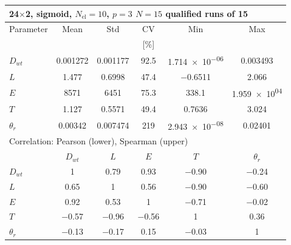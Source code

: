 \begin{tabular}{lccccc}
\toprule
\multicolumn{6}{l}{24$\times$2, sigmoid, $N_{\mathrm{el}}=10$, $p=3$ \quad $N=15$ qualified runs of 15} \\
\midrule
Parameter & Mean & Std & CV & Min & Max \\
 &  &  & [\%] &  & \\
\midrule
  $D_{wt}$ & \num{0.001272} & \num{0.001177} & \num{92.5} & \num{1.714e-06} & \num{0.003493} \\
  $L$ & \num{1.477} & \num{0.6998} & \num{47.4} & \num{-0.6511} & \num{2.066} \\
  $E$ & \num{8571} & \num{6451} & \num{75.3} & \num{338.1} & \num{1.959e+04} \\
  $T$ & \num{1.127} & \num{0.5571} & \num{49.4} & \num{0.7636} & \num{3.024} \\
  $\theta_r$ & \num{0.00342} & \num{0.007474} & \num{219} & \num{2.943e-08} & \num{0.02401} \\
\midrule
\multicolumn{6}{l}{Correlation: Pearson (lower), Spearman (upper)} \\
 & $D_{wt}$ & $L$ & $E$ & $T$ & $\theta_r$ \\
  $D_{wt}$ & 1 & \num{0.79} & \num{0.93} & \num{-0.90} & \num{-0.24} \\
  $L$ & \num{0.65} & 1 & \num{0.56} & \num{-0.90} & \num{-0.60} \\
  $E$ & \num{0.92} & \num{0.53} & 1 & \num{-0.71} & \num{-0.02} \\
  $T$ & \num{-0.57} & \num{-0.96} & \num{-0.56} & 1 & \num{0.36} \\
  $\theta_r$ & \num{-0.13} & \num{-0.17} & \num{0.15} & \num{-0.03} & 1 \\
\bottomrule
\end{tabular}

